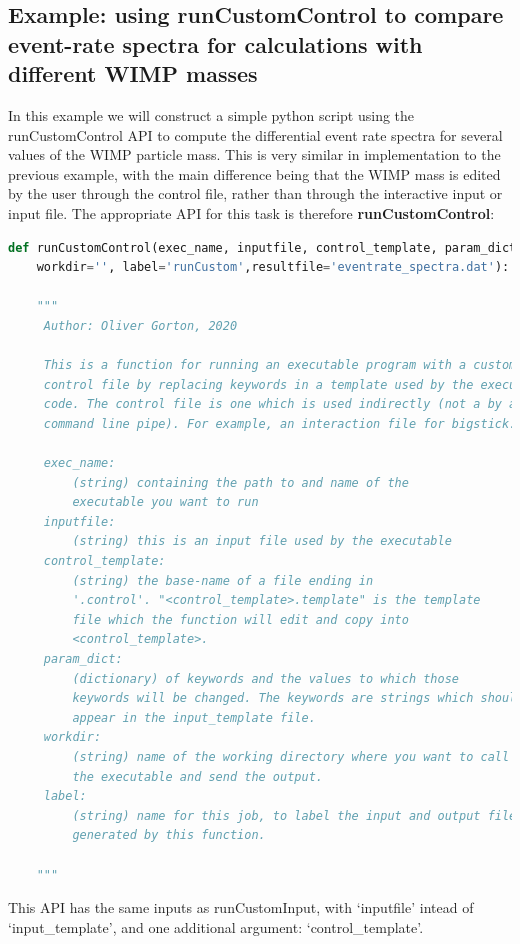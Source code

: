 \documentclass[12pt]{article}
\begin{document}
\subsection{Example: using runCustomControl to compare event-rate spectra for
calculations with different WIMP masses}

In this example we will construct a simple python script using the 
runCustomControl API to compute the differential event rate spectra for several
values of the WIMP particle mass. This is very similar in implementation to the
previous example, with the main difference being that the WIMP mass is edited by
the user through the control file, rather than through the interactive input or
input file. The appropriate API for this task is therefore \textbf{
runCustomControl}:
\begin{lstlisting}[language=python]
def runCustomControl(exec_name, inputfile, control_template, param_dict,
    workdir='', label='runCustom',resultfile='eventrate_spectra.dat'):

    """
     Author: Oliver Gorton, 2020

     This is a function for running an executable program with a custom
     control file by replacing keywords in a template used by the executed
     code. The control file is one which is used indirectly (not a by a 
     command line pipe). For example, an interaction file for bigstick.

     exec_name: 
         (string) containing the path to and name of the
         executable you want to run
     inputfile: 
         (string) this is an input file used by the executable
     control_template: 
         (string) the base-name of a file ending in 
         '.control'. "<control_template>.template" is the template 
         file which the function will edit and copy into 
         <control_template>.
     param_dict: 
         (dictionary) of keywords and the values to which those 
         keywords will be changed. The keywords are strings which should 
         appear in the input_template file. 
     workdir: 
         (string) name of the working directory where you want to call
         the executable and send the output.
     label: 
         (string) name for this job, to label the input and output files 
         generated by this function.

    """
\end{lstlisting}
This API has the same inputs as runCustomInput, with `inputfile' intead of
`input\_template', and one additional argument: `control\_template'.
\end{document}
